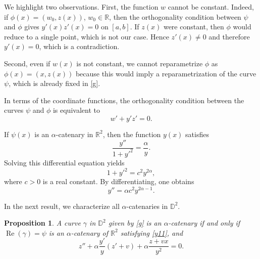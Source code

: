\documentclass[a4paper,12pt]{amsart}
\newtheorem{proposition}[theorem]{Proposition}
\theoremstyle{definition}
\def\r{\mathbb R}
\def\d{\mathsf d}
\def\d{\mathbb D}
\begin{document}
We highlight two observations. First, the function $w$ cannot be constant. Indeed, if $\phi(x)=(w_0,z(x))$, $w_0\in\r$, then the orthogonality condition between $\psi$ and $\phi$ gives $y'(x)z'(x)=0$ on $[a,b]$. If $z(x)$ were constant, then $\phi$ would reduce to a single point, which is not our case. Hence $z'(x)\neq 0$ and therefore $y'(x)=0$, which is a contradiction. 

Second, even if $w(x)$ is not constant, we cannot reparametrize $\phi$ as $\phi(x)=(x,z(x))$ because this would imply a reparametrization of the curve $\psi$, which is already fixed in \eqref{g}.
 
In terms of the coordinate functions, the orthogonality condition between the curves $\psi$ and $\phi$ is equivalent to  
\begin{equation}\label{orto}
w'+y'z'=0.
\end{equation}


If $\psi(x)$ is an $\alpha$-catenary in $\r^2$, then the function $y(x)$ satisfies
\begin{equation}\label{y11}
\frac{y''}{1+y'^2}=\frac{\alpha}{y}.
\end{equation}
Solving this differential equation yields
\begin{equation}
1+y'^2=c^2y^{2\alpha}, \label{y12}
\end{equation}
where $c>0$ is a real constant. By differentiating, one obtains 
\begin{equation}\label{y13}
y''=\alpha c^2 y^{2\alpha-1}.
\end{equation}

  
In the next result, we characterize  all $\alpha$-catenaries in $\d^2$.
\begin{proposition}\label{p22}
A curve $\gamma $ in $\d^2$  given by \eqref{g} is an $\alpha$-catenary if and only if $\operatorname{Re}(\gamma)=\psi$ is an $\alpha$-catenary of $\r^2$ satisfying \eqref{y11}, and  
\begin{equation}\label{eq1}
 z'' + \alpha \frac{y'}{y}(z'+v) + \alpha \frac{z+vx}{y^2} = 0.
\end{equation}
\end{proposition}
\end{document}
